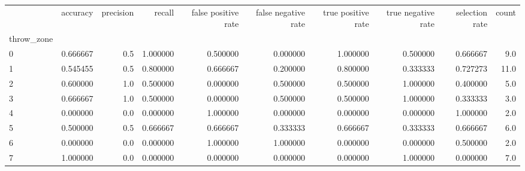 \begin{tabular}{lrrrrrrrrr}
\toprule
{} &  accuracy &  precision &    recall &  false positive rate &  false negative rate &  true positive rate &  true negative rate &  selection rate &  count \\
throw\_zone &           &            &           &                      &                      &                     &                     &                 &        \\
\midrule
0          &  0.666667 &        0.5 &  1.000000 &             0.500000 &             0.000000 &            1.000000 &            0.500000 &        0.666667 &    9.0 \\
1          &  0.545455 &        0.5 &  0.800000 &             0.666667 &             0.200000 &            0.800000 &            0.333333 &        0.727273 &   11.0 \\
2          &  0.600000 &        1.0 &  0.500000 &             0.000000 &             0.500000 &            0.500000 &            1.000000 &        0.400000 &    5.0 \\
3          &  0.666667 &        1.0 &  0.500000 &             0.000000 &             0.500000 &            0.500000 &            1.000000 &        0.333333 &    3.0 \\
4          &  0.000000 &        0.0 &  0.000000 &             1.000000 &             0.000000 &            0.000000 &            0.000000 &        1.000000 &    2.0 \\
5          &  0.500000 &        0.5 &  0.666667 &             0.666667 &             0.333333 &            0.666667 &            0.333333 &        0.666667 &    6.0 \\
6          &  0.000000 &        0.0 &  0.000000 &             1.000000 &             1.000000 &            0.000000 &            0.000000 &        0.500000 &    2.0 \\
7          &  1.000000 &        0.0 &  0.000000 &             0.000000 &             0.000000 &            0.000000 &            1.000000 &        0.000000 &    7.0 \\
\bottomrule
\end{tabular}
